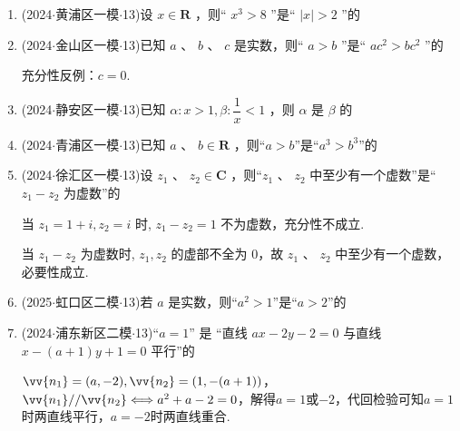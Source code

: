 \begin{enumerate}
    \item (2024$\cdot$黄浦区一模$\cdot$13)设 $x \in  \mathbf{R}$ ，则“ ${x}^{3} > 8$ ”是“ $\left| x\right|  > 2$ ”的 

    \item (2024$\cdot$金山区一模$\cdot$13)已知 $a$ 、 $b$ 、 $c$ 是实数，则“ $a > b$ ”是“ $a{c}^{2} > b{c}^{2}$ ”的 
    \begin{jieda}
        充分性反例：$c = 0$.
    \end{jieda}

    \item (2024$\cdot$静安区一模$\cdot$13)已知 $\alpha  : x > 1,\beta  : \dfrac{1}{x} < 1$ ，则 $\alpha$ 是 $\beta$ 的 

    \item (2024$\cdot$青浦区一模$\cdot$13)已知 $a$ 、 $b \in  \mathbf{R}$ ，则“$a > b$”是“${a}^{3} > {b}^{3}$”的 

    \item (2024$\cdot$徐汇区一模$\cdot$13)设 ${z}_{1}$ 、 ${z}_{2} \in  \mathbf{C}$ ，则“${z}_{1}$ 、 ${z}_{2}$ 中至少有一个虚数”是“${z}_{1} - {z}_{2}$ 为虚数”的 
    \begin{jieda}
        当 ${z}_{1} = 1 + {i},{z}_{2} = {i}$ 时, ${z}_{1} - {z}_{2} = 1$ 不为虚数，充分性不成立.

        当 ${z}_{1} - {z}_{2}$ 为虚数时, ${z}_{1},{z}_{2}$ 的虚部不全为 0，故 ${z}_{1}$ 、 ${z}_{2}$ 中至少有一个虚数，必要性成立. 
    \end{jieda}

    \item (2025$\cdot$虹口区二模$\cdot$13)若 $a$ 是实数，则“${a}^{2} > 1$”是“$a > 2$”的

    \item (2024$\cdot$浦东新区二模$\cdot$13)“$a = 1$” 是 “直线 $ax - {2y} - 2 = 0$ 与直线 $x - \left( {a + 1}\right) y + 1 = 0$ 平行”的 
    \begin{jieda}
        $\vv{n_1} = (a, -2), \vv{n_2} = (1, -(a+1))$，$\vv{n_1} // \vv{n_2} \Longleftrightarrow a^2+a-2 = 0$，解得$a = 1$或$-2$，代回检验可知$a = 1$时两直线平行，$a = -2$时两直线重合.
    \end{jieda}


\end{enumerate}
